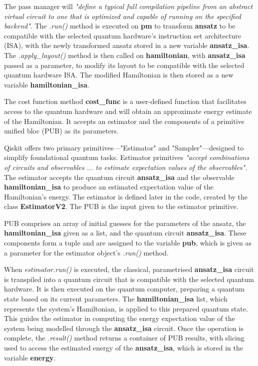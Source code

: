\documentclass{article}
\begin{document}
{The pass manager will \textit{"define a typical full compilation pipeline from an abstract virtual circuit to one that is optimized and capable of running on the specified backend"}\cite{StagedPassManager}. The \textit{.run()} method is executed on \textbf{pm} to transform \textbf{ansatz} to be compatible with the selected quantum hardware's instruction set architecture (ISA), with the newly transformed ansatz stored in a new variable \textbf{ansatz\_isa}\cite{ISACirc}. The \textit{.apply\_layout()} method is then called on \textbf{hamiltonian}, with \textbf{ansatz\_isa} passed as a parameter, to modify its layout to be compatible with the selected quantum hardware ISA. The modified Hamiltonian is then stored as a new variable  \textbf{hamiltonian\_isa}.

The cost function method \textbf{cost\_func} is a user-defined function that facilitates access to the quantum hardware and will obtain an approximate energy estimate of the Hamiltonian. It accepts an estimator and the components of a primitive unified bloc (PUB) as its parameters. 

 Qiskit offers two primary primitives—"Estimator" and "Sampler"—designed to simplify foundational quantum tasks\cite{QiskitRuntime}. Estimator primitives \textit{"accept combinations of circuits and observables ... to estimate expectation values of the observables"}\cite{Primitives}. The estimator accepts the quantum circuit \textbf{ansatz\_isa} and the observable \textbf{hamiltonian\_isa} to produce an estimated expectation value of the Hamiltonian's energy. The estimator is defined later in the code, created by the class \textbf{EstimatorV2}. The PUB is the input given to the estimator primitive.

PUB comprises an array of initial guesses for the parameters of the ansatz, the \textbf{hamiltonian\_isa} given as a list, and the quantum circuit \textbf{ansatz\_isa}. These components form a tuple and are assigned to the variable \textbf{pub}, which is given as a parameter for the estimator object's \textit{.run()} method. 

When \textit{estimator.run()} is executed, the classical, parametrised \textbf{ansatz\_isa} circuit is transpiled into a quantum circuit that is compatible with the selected quantum hardware. It is then executed on the quantum computer, preparing a quantum state based on its current parameters\cite{EstimatorV2}\cite{Tutorial}. The \textbf{hamiltonian\_isa} list, which represents the system's Hamiltonian, is applied to this prepared quantum state. This guides the estimator in computing the energy expectation value of the system being modelled through the \textbf{ansatz\_isa} circuit. Once the operation is complete, the \textit{.result()} method returns a container of PUB results\cite{PrimitiveResult}, with slicing used to access the estimated energy of the \textbf{ansatz\_isa}, which is stored in the variable \textbf{energy}.

}
\end{document}
